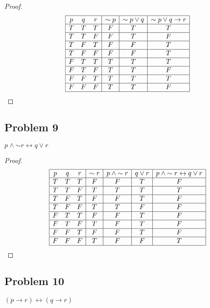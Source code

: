 \documentclass[14pt]{extarticle}
\newcommand{\bic}{\leftrightarrow}
\begin{document}
\begin{proof}
$$
\begin{array}{|ccc|c|c|c|}
\hline
p & q & r & {\sim p} & {\sim p} \vee q & {\sim p} \vee q \to r \\
\hline
T & T & T & F & T & T \\
\hline
T & T & F & F & T & F \\
\hline
T & F & T & F & F & T \\
\hline
T & F & F & F & F & T \\
\hline
F & T & T & T & T & T \\
\hline
F & T & F & T & T & F \\
\hline
F & F & T & T & T & T \\
\hline
F & F & F & T & T & F \\
\hline
\end{array}
$$
\end{proof}

\subsection{Problem 9}
$p \wedge {\sim r} \bic q \vee r$

\begin{proof}
$$
\begin{array}{|ccc|c|c|c|c|}
\hline
p & q & r & {\sim r} & p \wedge {\sim r} & q \vee r & p \wedge {\sim r} \bic q
\vee r \\
\hline
T & T & T & F & F & T & F \\
\hline
T & T & F & T & T & T & T \\
\hline
T & F & T & F & F & T & F \\
\hline
T & F & F & T & T & F & F \\
\hline
F & T & T & F & F & T & F \\
\hline
F & T & F & T & F & T & F \\
\hline
F & F & T & F & F & T & F \\
\hline
F & F & F & T & F & F & T \\
\hline
\end{array}
$$
\end{proof}

\subsection{Problem 10}
$(p \to r) \bic (q \to r)$
\end{document}
